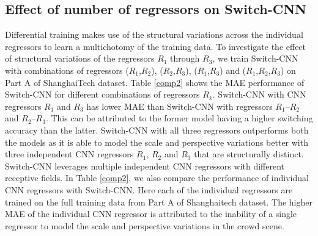 \documentclass[10pt,twocolumn,letterpaper]{article}
\begin{document}
\subsection{Effect of number of regressors on Switch-CNN}
Differential training makes use of the structural variations across
the individual regressors to learn a multichotomy of the training data. To investigate the effect of structural variations of the regressors $R_1$ through $R_3$, we train Switch-CNN with combinations of regressors ($R_1$,$R_2$), ($R_2$,$R_3$), ($R_1$,$R_3$) and ($R_1$,$R_2$,$R_3$) on Part A of ShanghaiTech dataset. Table \ref{comp2} shows the MAE performance of Switch-CNN for different combinations of regressors $R_k$. Switch-CNN with CNN regressors $R_1$ and $R_3$ has lower MAE
than Switch-CNN with regressors $R_1$--$R_2$ and $R_2$--$R_3$. This can be attributed to the former model having a higher switching accuracy than the latter. Switch-CNN with all three regressors outperforms both the models as it is able to model the scale and perspective variations better with three independent CNN regressors $R_1$, $R_2$ and $R_3$ that are structurally distinct.
Switch-CNN leverages multiple independent CNN regressors with different receptive fields. In Table \ref{comp2}, we also compare the performance of individual CNN regressors with Switch-CNN. Here each of the individual regressors are trained on the full training data from Part A of Shanghaitech dataset. The higher MAE of the individual CNN regressor is attributed to the inability of a single regressor to model the scale and perspective variations in the crowd scene. 

\begin{comment}
\begin{table}[tbh]
\begin{centering}
\begin{tabular}{|c|c|}
\hline 
Method & MAE\tabularnewline
\hline 
\hline 
$R_1$  & 157.61\tabularnewline
\hline 
$R_2$ & 178.82\tabularnewline
\hline 
$R_3$ & 178.10\tabularnewline
\hline 
\textbf{Switch-CNN} & \textbf{90.41}\tabularnewline
\hline 
\end{tabular}\medskip{}

\par\end{centering}

\caption{Comparison of MAE performance of Switch-CNN against individual CNN regressors $R_1$ though $R_3$ on Part A of the ShanghaiTech dataset~\cite{zhang2016single}.}
\label{comp1}
\end{table}
\end{comment}
\end{document}
